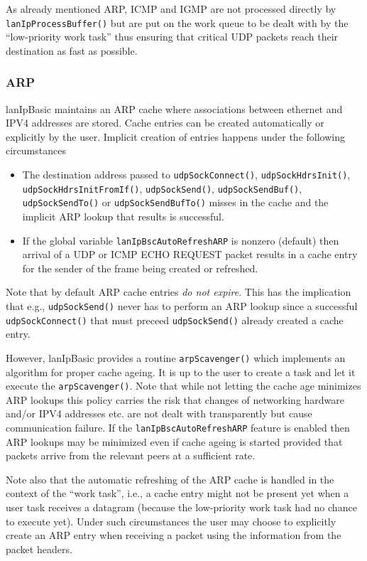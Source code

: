 \documentclass{article}
\newcommand{\lip}{lanIpBasic}
\newcommand{\ethn}{ethernet}
\newcommand{\lipc}[1]{{\tt #1}}
\newcommand{\cmd}[1]{{\tt #1}}
\begin{document}
As already mentioned ARP, ICMP and IGMP are not processed directly
by \cmd{lanIpProcessBuffer()} but are put on the work queue to
be dealt with by the ``low-priority work task'' thus ensuring
that critical UDP packets reach their destination as fast as 
possible.

    \subsubsection{ARP}
\lip{} maintains an ARP cache where associations between \ethn{} and
IPV4 addresses are stored. Cache entries can be created automatically
or explicitly by the user. Implicit creation of entries happens under
the following circumstances
\begin{itemize}
\item The destination address passed to \lipc{udpSockConnect()},
      \lipc{udpSockHdrsInit()}, \lipc{udpSockHdrsInitFromIf()},
      \lipc{udpSockSend()}, \lipc{udpSockSendBuf()}, \lipc{udpSockSendTo()}
      or \lipc{udpSockSendBufTo()} misses in the
      cache and the implicit ARP lookup that results is successful.
\item If the global variable \lipc{lanIpBscAutoRefreshARP} is nonzero (default)
      then arrival of a UDP or ICMP ECHO REQUEST packet results in a 
      cache entry for the sender of the frame being created or refreshed.
\end{itemize}
Note that by default ARP cache entries {\em do not expire}. This has
the implication that e.g., \lipc{udpSockSend()} never has to perform
an ARP lookup since a successful \lipc{udpSockConnect()} that must 
preceed \lipc{udpSockSend()} already created a cache entry.

However, \lip{} provides a routine \lipc{arpScavenger()} which implements
an algorithm for proper cache ageing. It is up to the user to create a
task and let it execute the \lipc{arpScavenger()}. Note that while not
letting the cache age minimizes ARP lookups this policy carries the risk that
changes of networking hardware and/or IPV4 addresses etc. are not
dealt with transparently but cause communication failure. If the
\lipc{lanIpBscAutoRefreshARP} feature is enabled then ARP lookups
may be minimized even if cache ageing is started provided that 
packets arrive from the relevant peers at a sufficient rate.

Note also that the automatic refreshing of the ARP cache is
handled in the context of the ``work task'', i.e., a cache entry
might not be present yet when a user task receives a datagram
(because the low-priority work task had no chance to execute yet).
Under such circumstances the user may choose to explicitly create
an ARP entry when receiving a packet using the information from
the packet headers.
\end{document}
